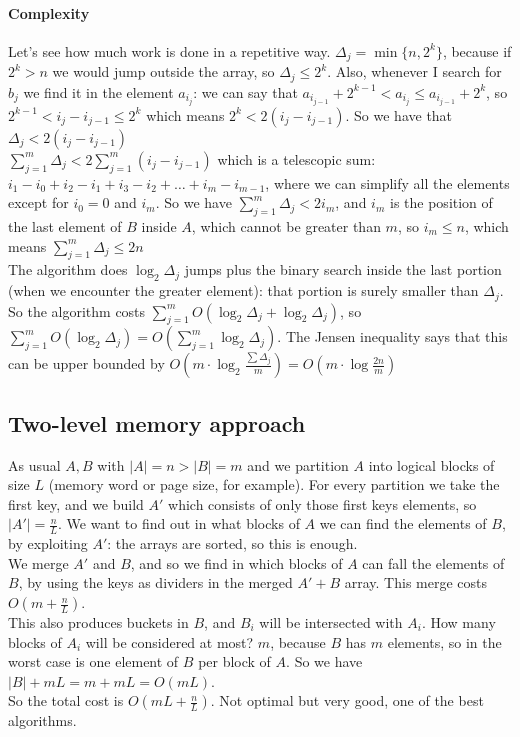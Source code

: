\documentclass[10pt]{report}
\begin{document}
\paragraph{Complexity} Let's see how much work is done in a repetitive way. $\Delta_j = \min\{n, 2^k\}$, because if $2^k > n$ we would jump outside the array, so $\Delta_j \leq 2^k$. Also, whenever I search for $b_j$ we find it in the element $a_{i_j}$: we can say that $a_{i_{j-1}} + 2^{k-1} < a_{i_j} \leq a_{i_{j-1}} + 2^k$, so $2^{k-1} < i_j - i_{j-1} \leq 2^k$ which means $2^k < 2(i_j - i_{j-1})$. So we have that $\Delta_j < 2(i_j - i_{j-1})$\\
$\sum_{j=1}^m \Delta_j < 2\sum_{j=1}^m (i_j - i_{j-1})$ which is a telescopic sum: $i_1 - i_0 + i_2 - i_1 + i_3 - i_2 + \ldots + i_m - i_{m-1}$, where we can simplify all the elements except for $i_0 = 0$ and $i_m$. So we have $\sum_{j=1}^m \Delta_j < 2 i_m$, and $i_m$ is the position of the last element of $B$ inside $A$, which cannot be greater than $m$, so $i_m \leq n$, which means $\sum_{j=1}^m \Delta_j \leq 2n$\\
The algorithm does $\log_2 \Delta_j$ jumps plus the binary search inside the last portion (when we encounter the greater element): that portion is surely smaller than $\Delta_j$. So the algorithm costs $\sum_{j=1}^m O(\log_2\Delta_j + \log_2 \Delta_j)$, so $\sum_{j=1}^m O(\log_2\Delta_j) = O\left(\sum_{j=1}^m\log_2\Delta_j\right)$. The Jensen inequality says that this can be upper bounded by $O\left(m\cdot\log_2\frac{\sum\Delta_j}{m}\right) = O(m\cdot\log\frac{2n}{m})$
\subsection{Two-level memory approach} As usual $A, B$ with $|A| = n > |B| = m$ and we partition $A$ into logical blocks of size $L$ (memory word or page size, for example). For every partition we take the first key, and we build $A'$ which consists of only those first keys elements, so $|A'| = \frac{n}{L}$. We want to find out in what blocks of $A$ we can find the elements of $B$, by exploiting $A'$: the arrays are sorted, so this is enough.\\
We merge $A'$ and $B$, and so we find in which blocks of $A$ can fall the elements of $B$, by using the keys as dividers in the merged $A'+B$ array. This merge costs $O\left(m + \frac{n}{L}\right)$.\\
This also produces buckets in $B$, and $B_i$ will be intersected with $A_i$. How many blocks of $A_i$ will be considered at most? $m$, because $B$ has $m$ elements, so in the worst case is one element of $B$ per block of $A$. So we have $|B| + mL = m + mL = O(mL)$.\\
So the total cost is $O(mL + \frac{n}{L})$. Not optimal but very good, one of the best algorithms.
\end{document}
